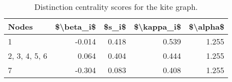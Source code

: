 \begin{table}
\centering
\caption{\label{tab:kite}Distinction centrality scores for the kite graph.}
\centering
\begin{tabular}[t]{lrrrr}
\toprule
Nodes & \$\textbackslash{}beta\_i\$ & \$s\_i\$ & \$\textbackslash{}kappa\_i\$ & \$\textbackslash{}alpha\$\\
\midrule
1 & -0.014 & 0.418 & 0.539 & 1.255\\
2, 3, 4, 5, 6 & 0.064 & 0.404 & 0.444 & 1.255\\
7 & -0.304 & 0.083 & 0.408 & 1.255\\
\bottomrule
\end{tabular}
\end{table}
